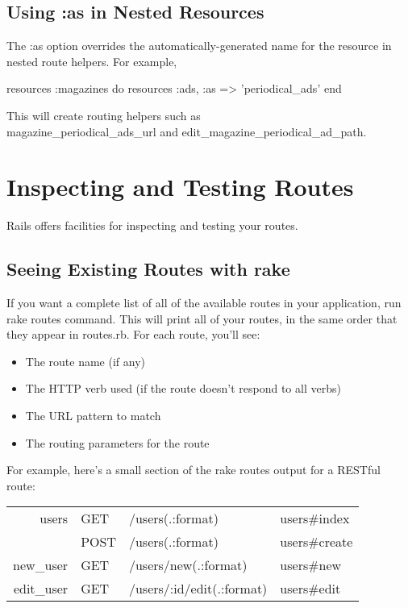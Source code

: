 \documentclass[10pt]{book}
\newenvironment{code}{%
  \scriptsize
    \verbatim
}{%
    \endverbatim
    \newline
}
\begin{document}
\subsection{ Using :as in Nested Resources}

The :as option overrides the automatically-generated name for the resource in nested route helpers. For example,
\begin{code}
resources :magazines do
  resources :ads, :as => 'periodical_ads'
end
\end{code}

This will create routing helpers such as \\ magazine\_periodical\_ads\_url and edit\_magazine\_periodical\_ad\_path.

\section{ Inspecting and Testing Routes}

Rails offers facilities for inspecting and testing your routes.

\subsection{ Seeing Existing Routes with rake}

If you want a complete list of all of the available routes in your application, run rake routes command. This will print all of your routes, in the same order that they appear in routes.rb. For each route, you’ll see:
\begin{itemize}
	\item The route name (if any)
	\item The HTTP verb used (if the route doesn’t respond to all verbs)
	\item The URL pattern to match
	\item The routing parameters for the route
\end{itemize}

For example, here’s a small section of the rake routes output for a RESTful route:\\

\noindent
\begin{tabular}{rlp{}p{}}
    users & GET  &  /users(.:format)    &      users\#index \\
         & POST &  /users(.:format)     &     users\#create \\
 new\_user &  GET  &  /users/new(.:format)  &    users\#new \\
edit\_user & GET  &  /users/:id/edit(.:format) & users\#edit \\
\end{tabular}\\
\end{document}
